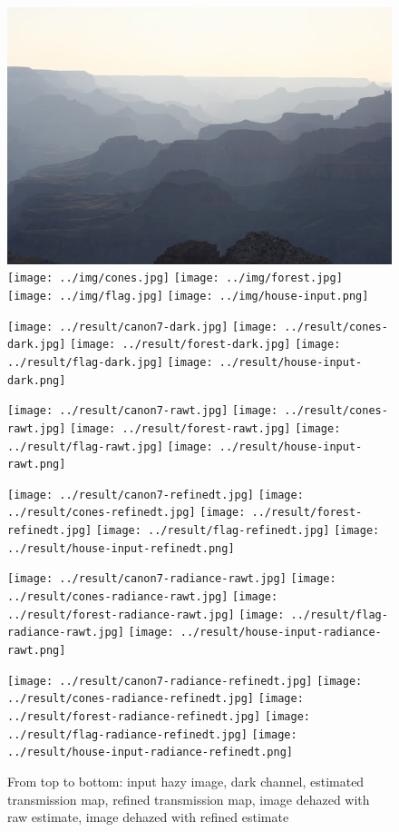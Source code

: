 \documentclass{article}
\begin{document}
\begin{figure}[H]
    \centering
    \begin{minipage}[b]{\linewidth}
        \centering
        \includegraphics[height=0.18\linewidth]{../img/canon7.jpg}
        \texttt{[image: ../img/cones.jpg]}
        \texttt{[image: ../img/forest.jpg]}
        \texttt{[image: ../img/flag.jpg]}
        \texttt{[image: ../img/house-input.png]}
    \end{minipage}
    \begin{minipage}[b]{\linewidth}
        \centering
        \texttt{[image: ../result/canon7-dark.jpg]}
        \texttt{[image: ../result/cones-dark.jpg]}
        \texttt{[image: ../result/forest-dark.jpg]}
        \texttt{[image: ../result/flag-dark.jpg]}
        \texttt{[image: ../result/house-input-dark.png]}
    \end{minipage}
    \begin{minipage}[b]{\linewidth}
        \centering
        \texttt{[image: ../result/canon7-rawt.jpg]}
        \texttt{[image: ../result/cones-rawt.jpg]}
        \texttt{[image: ../result/forest-rawt.jpg]}
        \texttt{[image: ../result/flag-rawt.jpg]}
        \texttt{[image: ../result/house-input-rawt.png]}
    \end{minipage}
    \begin{minipage}[b]{\linewidth}
        \centering
        \texttt{[image: ../result/canon7-refinedt.jpg]}
        \texttt{[image: ../result/cones-refinedt.jpg]}
        \texttt{[image: ../result/forest-refinedt.jpg]}
        \texttt{[image: ../result/flag-refinedt.jpg]}
        \texttt{[image: ../result/house-input-refinedt.png]}
    \end{minipage}
    \begin{minipage}[b]{\linewidth}
        \centering
        \texttt{[image: ../result/canon7-radiance-rawt.jpg]}
        \texttt{[image: ../result/cones-radiance-rawt.jpg]}
        \texttt{[image: ../result/forest-radiance-rawt.jpg]}
        \texttt{[image: ../result/flag-radiance-rawt.jpg]}
        \texttt{[image: ../result/house-input-radiance-rawt.png]}
    \end{minipage}
    \begin{minipage}[b]{\linewidth}
        \centering
        \texttt{[image: ../result/canon7-radiance-refinedt.jpg]}
        \texttt{[image: ../result/cones-radiance-refinedt.jpg]}
        \texttt{[image: ../result/forest-radiance-refinedt.jpg]}
        \texttt{[image: ../result/flag-radiance-refinedt.jpg]}
        \texttt{[image: ../result/house-input-radiance-refinedt.png]}
    \end{minipage}
    \caption{From top to bottom: input hazy image, dark channel, estimated transmission map, refined transmission map, image dehazed with raw estimate, image dehazed with refined estimate}
    \label{fig:result1}
\end{figure}
\end{document}
